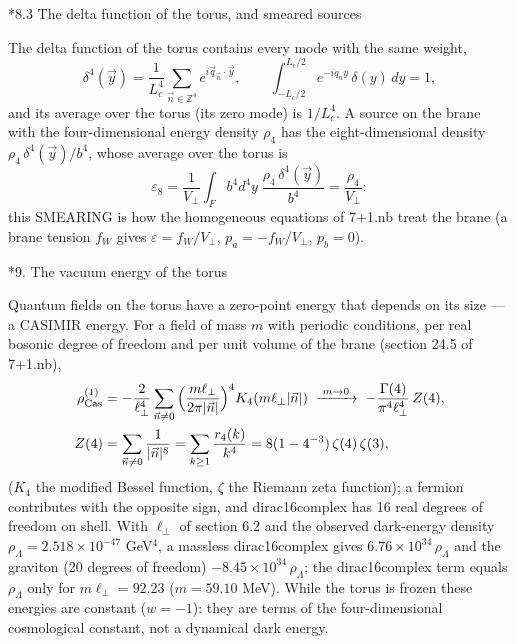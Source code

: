 \documentclass[10pt,a4paper]{article}
\makeatletter
\renewcommand\section{\@startsection{section}{1}{\z@}{-3.5ex \@plus -1ex \@minus -.2ex}{2.3ex \@plus.2ex}{\normalfont\Large\bfseries\raggedright}}
\renewcommand\subsection{\@startsection{subsection}{2}{\z@}{-3.25ex\@plus -1ex \@minus -.2ex}{1.5ex \@plus .2ex}{\normalfont\large\bfseries\raggedright}}
\makeatother
\begin{document}
\subsection*{8.3 The delta function of the torus, and smeared sources}
The delta function of the torus contains every mode with the same weight,
\begin{equation*}
\delta^4(\vec y)=\frac1{L_c^4}\sum_{\vec n\in\mathbb Z^4}e^{i\vec q_{\vec n}\cdot\vec y},\qquad \int_{-L_c/2}^{L_c/2}e^{-iq_ny}\,\delta(y)\,dy=1,
\end{equation*}
and its average over the torus (its zero mode) is $1/L_c^4$. A source on the brane with the four-dimensional energy density $\rho_4$ has the eight-dimensional density $\rho_4\,\delta^4(\vec y)/b^4$, whose average over the torus is
\begin{equation*}
\varepsilon_8=\frac1{V_\perp}\int_Fb^4d^4y\;\frac{\rho_4\,\delta^4(\vec y)}{b^4}=\frac{\rho_4}{V_\perp} :
\end{equation*}
this SMEARING is how the homogeneous equations of 7+1.nb treat the brane (a brane tension $f_W$ gives $\varepsilon=f_W/V_\perp$, $p_a=-f_W/V_\perp$, $p_b=0$).

\section*{9. The vacuum energy of the torus}
Quantum fields on the torus have a zero-point energy that depends on its size — a CASIMIR energy. For a field of mass $m$ with periodic conditions, per real bosonic degree of freedom and per unit volume of the brane (section 24.5 of 7+1.nb),
\begin{align*}
\rho_{\rm Cas}^{(1)}&=-\frac2{\ell_\perp^4}\sum_{\vec n\ne0}\Big(\frac{m\ell_\perp}{2\pi|\vec n|}\Big)^4K_4(m\ell_\perp|\vec n|)\;\xrightarrow{\;m\to0\;}\;-\frac{\Gamma(4)}{\pi^4\ell_\perp^4}\,Z(4), \\
Z(4)&=\sum_{\vec n\ne0}\frac1{|\vec n|^8}=\sum_{k\ge1}\frac{r_4(k)}{k^4}=8(1-4^{-3})\,\zeta(4)\,\zeta(3),
\end{align*}
($K_4$ the modified Bessel function, $\zeta$ the Riemann zeta function); a fermion contributes with the opposite sign, and dirac16complex has 16 real degrees of freedom on shell. With $\ell_\perp$ of section 6.2 and the observed dark-energy density $\rho_\Lambda=2.518\times10^{-47}$ GeV$^4$, a massless dirac16complex gives $6.76\times10^{34}\,\rho_\Lambda$ and the graviton (20 degrees of freedom) $-8.45\times10^{34}\,\rho_\Lambda$; the dirac16complex term equals $\rho_\Lambda$ only for $m\ell_\perp=92.23$ ($m=59.10$ MeV). While the torus is frozen these energies are constant ($w=-1$): they are terms of the four-dimensional cosmological constant, not a dynamical dark energy.
\end{document}
